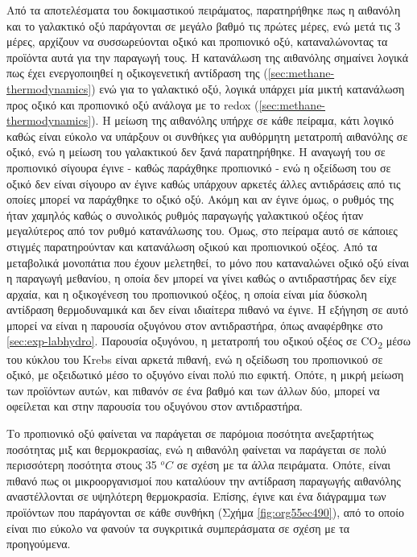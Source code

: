 \documentclass[11pt]{report}
\begin{document}
Από τα αποτελέσματα του δοκιμαστικού πειράματος, παρατηρήθηκε πως η αιθανόλη και το γαλακτικό οξύ παράγονται σε μεγάλο βαθμό τις πρώτες μέρες, ενώ μετά τις 3 μέρες, αρχίζουν να συσσωρεύονται οξικό και προπιονικό οξύ, καταναλώνοντας τα προϊόντα αυτά για την παραγωγή τους. Η κατανάλωση της αιθανόλης σημαίνει λογικά πως έχει ενεργοποιηθεί η οξικογενετική αντίδραση της (\autoref{sec:methane-thermodynamics}) ενώ για το γαλακτικό οξύ, λογικά υπάρχει μία μικτή κατανάλωση προς οξικό και προπιονικό οξύ ανάλογα με το \acrshort{redox} (\autoref{sec:methane-thermodynamics}). Η μείωση της αιθανόλης υπήρχε σε κάθε πείραμα, κάτι λογικό καθώς είναι εύκολο να υπάρξουν οι συνθήκες για αυθόρμητη μετατροπή αιθανόλης σε οξικό, ενώ η μείωση του γαλακτικού δεν ξανά παρατηρήθηκε. Η αναγωγή του σε προπιονικό σίγουρα έγινε - καθώς παράχθηκε προπιονικό - ενώ η οξείδωση του σε οξικό δεν είναι σίγουρο αν έγινε καθώς υπάρχουν αρκετές άλλες αντιδράσεις από τις οποίες μπορεί να παράχθηκε το οξικό οξύ. Ακόμη και αν έγινε όμως, ο ρυθμός της ήταν χαμηλός καθώς ο συνολικός ρυθμός παραγωγής γαλακτικού οξέος ήταν μεγαλύτερος από τον ρυθμό κατανάλωσης του. Όμως, στο πείραμα αυτό σε κάποιες στιγμές παρατηρούνταν και κατανάλωση οξικού και προπιονικού οξέος. Από τα μεταβολικά μονοπάτια που έχουν μελετηθεί, το μόνο που καταναλώνει οξικό οξύ είναι η παραγωγή μεθανίου, η οποία δεν μπορεί να γίνει καθώς ο αντιδραστήρας δεν είχε αρχαία, και η οξικογένεση του προπιονικού οξέος, η οποία είναι μία δύσκολη αντίδραση θερμοδυναμικά και δεν είναι ιδιαίτερα πιθανό να έγινε. Η εξήγηση σε αυτό μπορεί να είναι η παρουσία οξυγόνου στον αντιδραστήρα, όπως αναφέρθηκε στο \autoref{sec:exp-labhydro}. Παρουσία οξυγόνου, η μετατροπή του οξικού οξέος σε CO\textsubscript{2} μέσω του κύκλου του Krebs είναι αρκετά πιθανή, ενώ η οξείδωση του προπιονικού σε οξικό, με οξειδωτικό μέσο το οξυγόνο είναι πολύ πιο εφικτή. Οπότε, η μικρή μείωση των προϊόντων αυτών, και πιθανόν σε ένα βαθμό και των άλλων δύο, μπορεί να οφείλεται και στην παρουσία του οξυγόνου στον αντιδραστήρα.

Το προπιονικό οξύ φαίνεται να παράγεται σε παρόμοια ποσότητα ανεξαρτήτως ποσότητας μιξ και θερμοκρασίας, ενώ η αιθανόλη φαίνεται να παράγεται σε πολύ περισσότερη ποσότητα στους 35 \(^oC\) σε σχέση με τα άλλα πειράματα. Οπότε, είναι πιθανό πως οι μικροοργανισμοί που καταλύουν την αντίδραση παραγωγής αιθανόλης αναστέλλονται σε υψηλότερη θερμοκρασία. Επίσης, έγινε και ένα διάγραμμα των προϊόντων που παράγονται σε κάθε συνθήκη (Σχήμα \ref{fig:org55ec490}), από το οποίο είναι πιο εύκολο να φανούν τα συγκριτικά συμπεράσματα σε σχέση με τα προηγούμενα.
\end{document}
